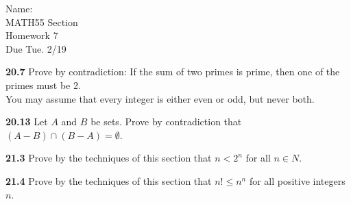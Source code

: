 \documentclass[10pt]{article}
\begin{document}
\begin{flushright}
	Name: \underline{\hspace{3cm}} \\
	MATH55 Section \underline{\hspace{0.5cm}} \\
	Homework 7 \\
	Due Tue. 2/19
\end{flushright}


\begin{framed}
	\textbf{20.7} Prove by contradiction: If the sum of two primes is prime, then one of the primes
	must be 2.\\
	You may assume that every integer is either even or odd, but never both.
\end{framed}

\pagebreak

\begin{framed}
	\textbf{20.13} Let $A$ and $B$ be sets. Prove by contradiction that $(A-B)\cap(B-A)=\emptyset$.
\end{framed}

\pagebreak

\begin{framed}
	\textbf{21.3} Prove by the techniques of this section that $n < 2^n$ for all $n \in N$.
\end{framed}

\pagebreak

\begin{framed}
	\textbf{21.4} Prove by the techniques of this section that $n! \leq n^n$ for all positive integers $n$.
\end{framed}
\end{document}

